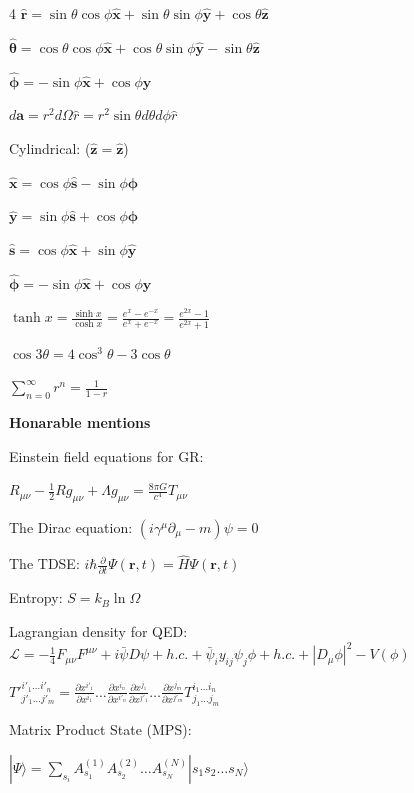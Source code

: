 \documentclass[a4paper,twoside]{article}
\newcommand{\secblock}[1]{%
\par\vspace{1.8pt}%
\noindent\colorbox{hdrcol}{\parbox[c][1.0em][c]{0.98\linewidth}{\color{white}\bfseries\small #1}}\par
\vspace{1pt}%
}
\begin{document}
\begin{multicols*}{4}
\(\hat{\bm{r}} = \sin\theta \cos \phi \hat{\bm x} + \sin \theta \sin \phi \hat{\bm y}+\cos \theta \hat{\bm z}\)

\(\hat{\bm \theta} = \cos\theta\cos\phi \hat{\bm x} + \cos\theta\sin\phi \hat{\bm y} - \sin\theta \hat{\bm z}\)

\(\hat{\bm \phi} = -\sin\phi \hat{\bm x} + \cos\phi \hat{\bm y}\)

\(d \bm a = r^2 d \Omega \hat{r} = r^2 \sin \theta d\theta d\phi \hat{r}\)

Cylindrical: (\(\hat{\bm z} = \hat{\bm z}\))

\(\hat{\bm x} = \cos \phi \hat{\bm s} - \sin \phi \hat{\bm \phi}\)

\(\hat{\bm y} = \sin \phi \hat{\bm s} + \cos \phi \hat{\bm \phi}\)



\(\hat{\bm s} = \cos \phi \hat{\bm x} + \sin \phi \hat{\bm y}\)

\(\hat{\bm \phi} = -\sin \phi \hat{\bm x} + \cos \phi \hat{\bm y}\)


\(\tanh x = \frac{\sinh x}{\cosh x} = \frac{e^x - e^{-x}}{e^x + e^{-x}} = \frac{e^{2x} -1}{e^{2x} + 1}\)

\(\cos 3 \theta = 4 \cos^3 \theta - 3 \cos \theta\)


\(\sum_{n=0}^{\infty} r^n = \frac{1}{1-r}\)


\secblock{Honarable mentions}

Einstein field equations for GR:

\(R_{\mu\nu} - \frac{1}{2}R g_{\mu\nu} + \Lambda g_{\mu\nu} = \frac{8\pi G}{c^4} T_{\mu\nu}\)

The Dirac equation:
\((i\gamma^\mu \partial_\mu - m)\psi = 0\)

The TDSE:
\(i\hbar \frac{\partial}{\partial t} \Psi(\mathbf{r}, t) = \hat{H} \Psi(\mathbf{r}, t)\)

Entropy:
\(S = k_B \ln \Omega\)

Lagrangian density for QED:
\(\mathcal{L} = -\frac{1}{4}F_{\mu\nu}F^{\mu\nu} + i\bar{\psi}D\psi + h.c. + \bar{\psi}_i y_{ij} \psi_j \phi + h.c. + |D_\mu \phi|^2 - V(\phi)\)


\(T'^{i'_1 \dots i'_n}_{j'_1 \dots j'_m} = \frac{\partial x^{i'_1}}{\partial x^{i_1}} \dots \frac{\partial x^{i_n}}{\partial x^{i'_n}} \frac{\partial x^{j_1}}{\partial x^{j'_1}} \dots \frac{\partial x^{j_m}}{\partial x^{j'_m}} T^{i_1 \dots i_n}_{j_1 \dots j_m}\)

Matrix Product State (MPS):

\(|\Psi\rangle = \sum_{s_i} A^{(1)}_{s_1} A^{(2)}_{s_2} \dots A^{(N)}_{s_N} |s_1 s_2 \dots s_N\rangle\)


\end{multicols*}
\end{document}
